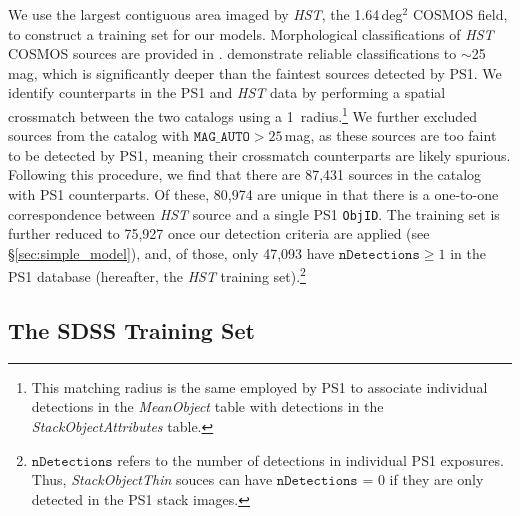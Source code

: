 \documentclass[twocolumn]{aastex62}
\begin{document}
\begin{CJK*}{UTF8}{gbsn}
We use the largest contiguous area imaged by \textit{HST}, the 1.64\,deg$^2$
COSMOS field, to construct a training set for our models. Morphological
classifications of \textit{HST} COSMOS sources are provided in
\citet{Leauthaud07}. \citeauthor{Leauthaud07} demonstrate reliable
classifications to $\sim$25\,mag, which is significantly deeper than the
faintest sources detected by PS1. We identify counterparts in the PS1 and
\textit{HST} data by performing a spatial crossmatch between the two catalogs
using a 1\arcsec\ radius.\footnote{This matching radius is the same employed
by PS1 to associate individual detections in the \textit{MeanObject} table
with detections in the \textit{StackObjectAttributes} table.} We further
excluded sources from the \citet{Leauthaud07} catalog with
$\texttt{MAG\_AUTO} > 25$\,mag, as these sources are too faint to be detected
by PS1, meaning their crossmatch counterparts are likely spurious. Following
this procedure, we find that there are 87,431 sources in the
\citet{Leauthaud07} catalog with PS1 counterparts. Of these, 80,974 are
unique in that there is a one-to-one correspondence between \textit{HST}
source and a single PS1 \texttt{ObjID}. The training set is further reduced
to 75,927 once our detection criteria are applied (see
\S\ref{sec:simple_model}), and, of those, only 47,093 have
$\texttt{nDetections} \ge 1$ in the PS1 database (hereafter, the \textit{HST}
training set).\footnote{$\texttt{nDetections}$ refers to the number of
detections in individual PS1 exposures. Thus, \textit{StackObjectThin} souces
can have $\texttt{nDetections}$ = 0 if they are only detected in the PS1
stack images.}

\subsection{The SDSS Training Set}\label{sec:sdss}


\end{CJK*}
\end{document}
